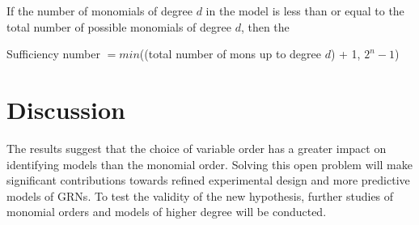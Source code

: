 \documentclass{amsart}
\theoremstyle{definition}
\theoremstyle{remark}
\theoremstyle{example}
\theoremstyle{conjecture}
\numberwithin{equation}{section}
\begin{document}
If the number of monomials of degree $d$ in the model is less than
or equal to the total number of possible monomials of degree $d$,
then the \\
\centerline{
Sufficiency number $=min$((total number of mons up to degree $d$) +
1, $2^n-1$)}






\section{Discussion}

The results suggest that the choice of  variable order has a greater
impact on identifying models than the monomial order. Solving this
open problem will make significant contributions towards refined
experimental design and more predictive models of GRNs. To test the
validity of the new hypothesis, further studies of monomial orders
and models of higher degree will be conducted.




\end{document}
